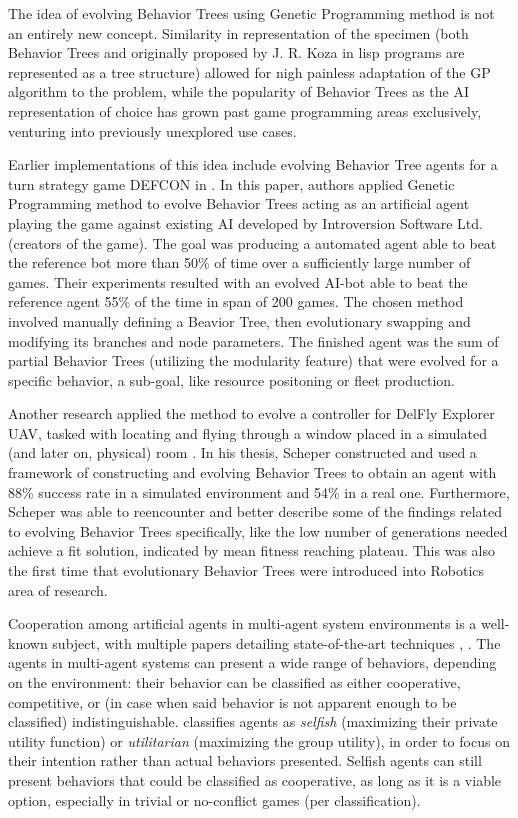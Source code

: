 The idea of evolving Behavior Trees using Genetic Programming method is not an entirely new concept. Similarity in representation of the specimen (both Behavior Trees and originally proposed by J. R. Koza in \cite{kozagp} lisp programs are represented as a tree structure) allowed for nigh painless adaptation of the GP algorithm to the problem, while the popularity of Behavior Trees as the AI representation of choice has grown past game programming areas exclusively, venturing into previously unexplored use cases.

Earlier implementations of this idea include evolving Behavior Tree agents for a turn strategy game DEFCON in \cite{defconbt}. In this paper, authors applied Genetic Programming method to evolve Behavior Trees acting as an artificial agent playing the game against existing AI developed by Introversion Software Ltd. (creators of the game). The goal was producing a automated agent able to beat the reference bot more than 50\% of time over a sufficiently large number of games. Their experiments resulted with an evolved AI-bot able to beat the reference agent 55\% of the time in span of 200 games. The chosen method involved manually defining a Beavior Tree, then evolutionary swapping and modifying its branches and node parameters. The finished agent was the sum of partial Behavior Trees (utilizing the modularity feature) that were evolved for a specific behavior, a sub-goal, like resource positoning or fleet production.

Another research applied the method to evolve a controller for DelFly Explorer UAV, tasked with locating and flying through a window placed in a simulated (and later on, physical) room \cite{ksheperthesis}. In his thesis, Scheper constructed and used a framework of constructing and evolving Behavior Trees to obtain an agent with 88\% success rate in a simulated environment and 54\% in a real one. Furthermore, Scheper was able to reencounter and better describe some of the \cite{defconbt} findings related to evolving Behavior Trees specifically, like the low number of generations needed achieve a fit solution, indicated by mean fitness reaching plateau. This was also the first time that evolutionary Behavior Trees were introduced into Robotics area of research.

Cooperation among artificial agents in multi-agent system environments is a well-known subject, with multiple papers detailing state-of-the-art techniques \cite{cooperationstateoftheart}, \cite{cooperativeandcompetitivelearning}. The agents in multi-agent systems can present a wide range of behaviors, depending on the environment: their behavior can be classified as either cooperative, competitive, or (in case when said behavior is not apparent enough to be classified) indistinguishable. \cite{cooperativeandcompetitivelearning} classifies agents as \textit{selfish} (maximizing their private utility function) or \textit{utilitarian} (maximizing the group utility), in order to focus on their intention rather than actual behaviors presented. Selfish agents can still present behaviors that could be classified as cooperative, as long as it is a viable option, especially in trivial or no-conflict games (per \cite{cooperativeandcompetitivelearning} classification).

